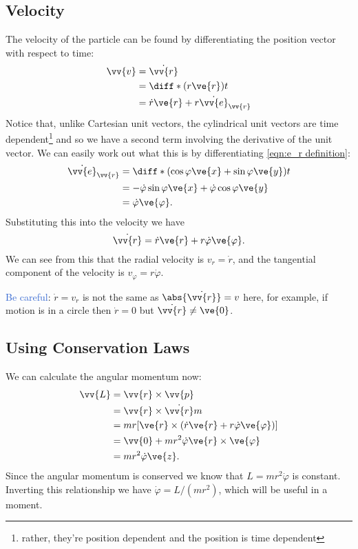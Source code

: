 \documentclass[fleqn]{NotesClass}
\newcommand*{\vedot}[1]{\dot{\vv{e}}_{\vv{#1}}}
\begin{document}
    \subsection{Velocity}
    The velocity of the particle can be found by differentiating the position vector with respect to time:
    \begin{align}
        \vv{v} &= \dot{\vv{r}}\\
        &= \diff*{(r\ve{r})}{t}\\
        &= \dot{r}\ve{r} + r\vedot{r}
    \end{align}
    Notice that, unlike Cartesian unit vectors, the cylindrical unit vectors are time dependent\footnote{rather, they're position dependent and the position is time dependent} and so we have a second term involving the derivative of the unit vector.
    We can easily work out what this is by differentiating \cref{eqn:e_r definition}:
    \begin{align}
        \vedot{r} &= \diff*{(\cos\varphi\ve{x} + \sin\varphi\ve{y})}{t}\\
        &= -\dot{\varphi}\sin\varphi\ve{x} + \dot{\varphi}\cos\varphi\ve{y}\\
        &= \dot{\varphi}\ve{\varphi}.
    \end{align}
    Substituting this into the velocity we have
    \begin{equation}
        \dot{\vv{r}} = \dot{r}\ve{r} + r\dot{\varphi}\ve{\varphi}.
    \end{equation}
    We can see from this that the radial velocity is \(v_r = \dot{r}\), and the tangential component of the velocity is \(v_\varphi = r\dot{\varphi}\).
    
    \textcolor{highlight}{Be careful}: \(\dot{r} = v_r\) is not the same as \(\abs{\dot{\vv{r}}} = v\) here, for example, if motion is in a circle then \(\dot{r} = 0\) but \(\dot{\vv{r}} \ne \ve{0}\).
    
    \subsection{Using Conservation Laws}
    We can calculate the angular momentum now:
    \begin{align}
        \vv{L} &= \vv{r}\times\vv{p}\\
        &= \vv{r}\times\dot{\vv{r}}m\\
        &= mr[\ve{r} \times (\dot{r}\ve{r} + r\dot{\varphi}\ve{\varphi})]\\
        &= \vv{0} + mr^2\dot{\varphi}\ve{r}\times\ve{\varphi}\\
        &= mr^2\dot{\varphi}\ve{z}.
    \end{align}
    Since the angular momentum is conserved we know that \(L = mr^2\dot{\varphi}\) is constant.
    Inverting this relationship we have \(\dot{\varphi} = L/(mr^2)\), which will be useful in a moment.
    
\end{document}
